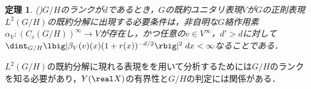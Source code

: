 \documentclass[12pt,dvipdfmx,uplatex]{jsarticle}
\newcounter{countabst}
\newtheorem{thm-a}[countabst]{定理}
\newtheorem{def-a}[countabst]{定義}
\begin{document}
\begin{thm-a}(\cite[pp.~665--6]{ber88})\label{thm:plancherel}
  $G/H$のランクが$d$であるとき，$G$の既約ユニタリ表現$V$が$G$の正則表現$L^2(G/H)$の既約分解に出現する必要条件は，非自明な$G$絡作用素$\alpha_V\colon (C_c(G/H))^{\infty}\to V $が存在し，かつ任意の$v\in V^{\infty} $，$d' > d$に対して$\dint_{G/H}\lbig|\beta_V(v)(x)(1+r(x))^{-d/2} \rbig|^2\; dx < \infty $なることである．%
\end{thm-a}

$L^2(G/H)$の既約分解に現れる表現をを用いて分析するためには$G/H$のランクを知る必要があり，$Y(\real X) $の有界性と$G/H$の判定には関係がある．%






\end{document}
